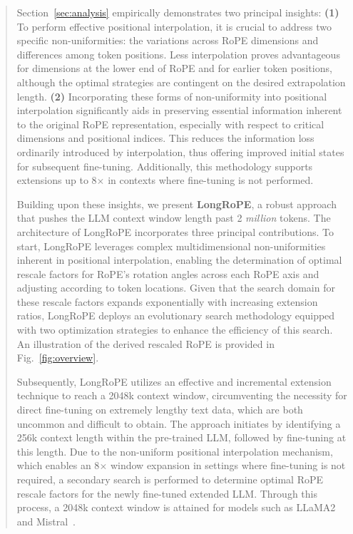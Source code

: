 \begin{abstract}
Section~\ref{sec:analysis} empirically demonstrates two principal insights: \textbf{(1)} To perform effective positional interpolation, it is crucial to address two specific non-uniformities: the variations across RoPE dimensions and differences among token positions. Less interpolation proves advantageous for dimensions at the lower end of RoPE and for earlier token positions, although the optimal strategies are contingent on the desired extrapolation length.
\textbf{(2)} Incorporating these forms of non-uniformity into positional interpolation significantly aids in preserving essential information inherent to the original RoPE representation, especially with respect to critical dimensions and positional indices. This reduces the information loss ordinarily introduced by interpolation, thus offering improved initial states for subsequent fine-tuning. Additionally, this methodology supports extensions up to 8$\times$ in contexts where fine-tuning is not performed.

Building upon these insights, we present \textbf{LongRoPE}, a robust approach that pushes the LLM context window length past 2 \emph{million} tokens. The architecture of LongRoPE incorporates three principal contributions. To start, {LongRoPE} leverages complex multidimensional non-uniformities inherent in positional interpolation, enabling the determination of optimal rescale factors for RoPE’s rotation angles across each RoPE axis and adjusting according to token locations. Given that the search domain for these rescale factors expands exponentially with increasing extension ratios, {LongRoPE} deploys an evolutionary search methodology equipped with two optimization strategies to enhance the efficiency of this search. An illustration of the derived rescaled RoPE is provided in Fig.~\ref{fig:overview}.

Subsequently, {LongRoPE} utilizes an effective and incremental extension technique to reach a 2048k context window, circumventing the necessity for direct fine-tuning on extremely lengthy text data, which are both uncommon and difficult to obtain. The approach initiates by identifying a 256k context length within the pre-trained LLM, followed by fine-tuning at this length. Due to the non-uniform positional interpolation mechanism, which enables an 8$\times$ window expansion in settings where fine-tuning is not required, a secondary search is performed to determine optimal RoPE rescale factors for the newly fine-tuned extended LLM. Through this process, a 2048k context window is attained for models such as LLaMA2 and Mistral~\cite{mistral}.


\end{abstract}
